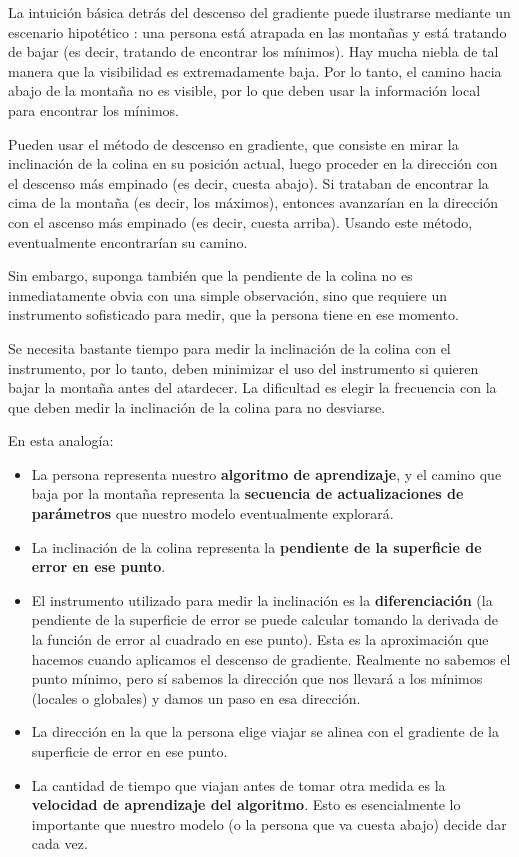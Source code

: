 \documentclass[a4paper,12pt]{article}
\begin{document}
La intuición básica detrás del descenso del gradiente puede ilustrarse mediante un escenario hipotético \citep{gdanalogy}: una persona está atrapada en las montañas y está tratando de bajar (es decir, tratando de encontrar los mínimos). Hay mucha niebla de tal manera que la visibilidad es extremadamente baja. Por lo tanto, el camino hacia abajo de la montaña no es visible, por lo que deben usar la información local para encontrar los mínimos.

Pueden usar el método de descenso en gradiente, que consiste en mirar la inclinación de la colina en su posición actual, luego proceder en la dirección con el descenso más empinado (es decir, cuesta abajo).
Si trataban de encontrar la cima de la montaña (es decir, los máximos), entonces avanzarían en la dirección con el ascenso más empinado (es decir, cuesta arriba). Usando este método, eventualmente encontrarían su camino.

Sin embargo, suponga también que la pendiente de la colina no es inmediatamente obvia con una simple observación, sino que requiere un instrumento sofisticado para medir, que la persona tiene en ese momento.

Se necesita bastante tiempo para medir la inclinación de la colina con el instrumento, por lo tanto, deben minimizar el uso del instrumento si quieren bajar la montaña antes del atardecer.
La dificultad es elegir la frecuencia con la que deben medir la inclinación de la colina para no desviarse.

En esta analogía:
\begin{itemize}[noitemsep, topsep=2pt]
	\item La persona representa nuestro \textbf{algoritmo de aprendizaje}, y el camino que baja por la montaña representa la \textbf{secuencia de actualizaciones de parámetros} que nuestro modelo eventualmente explorará.
	\item La inclinación de la colina representa la \textbf{pendiente de la superficie de error en ese punto}.
	\item El instrumento utilizado para medir la inclinación es la \textbf{diferenciación} (la pendiente de la superficie de error se puede calcular tomando la derivada de la función de error al cuadrado en ese punto). Esta es la aproximación que hacemos cuando aplicamos el descenso de gradiente. Realmente no sabemos el punto mínimo, pero sí sabemos la dirección que nos llevará a los mínimos (locales o globales) y damos un paso en esa dirección.
	\item La dirección en la que la persona elige viajar se alinea con el gradiente de la superficie de error en ese punto.
	\item La cantidad de tiempo que viajan antes de tomar otra medida es la \textbf{velocidad de aprendizaje del algoritmo}. Esto es esencialmente lo importante que nuestro modelo (o la persona que va cuesta abajo) decide dar cada vez.
\end{itemize}
\end{document}
